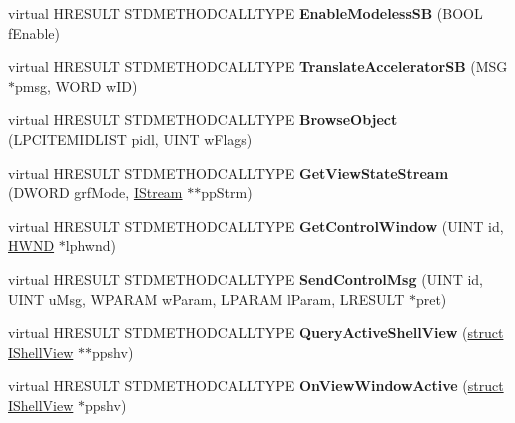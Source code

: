 \begin{DoxyCompactItemize}
virtual H\+R\+E\+S\+U\+LT S\+T\+D\+M\+E\+T\+H\+O\+D\+C\+A\+L\+L\+T\+Y\+PE {\bfseries Enable\+Modeless\+SB} (B\+O\+OL f\+Enable)
\item 
\mbox{\label{class_c_desktop_browser_a4ca359dde92b92bd9cf81b05a684ce3b}} 
virtual H\+R\+E\+S\+U\+LT S\+T\+D\+M\+E\+T\+H\+O\+D\+C\+A\+L\+L\+T\+Y\+PE {\bfseries Translate\+Accelerator\+SB} (M\+SG $\ast$pmsg, W\+O\+RD w\+ID)
\item 
\mbox{\label{class_c_desktop_browser_abce50bde5a24d06416c0c3e84f82889b}} 
virtual H\+R\+E\+S\+U\+LT S\+T\+D\+M\+E\+T\+H\+O\+D\+C\+A\+L\+L\+T\+Y\+PE {\bfseries Browse\+Object} (L\+P\+C\+I\+T\+E\+M\+I\+D\+L\+I\+ST pidl, U\+I\+NT w\+Flags)
\item 
\mbox{\label{class_c_desktop_browser_a8a6dfca4aac3681960f8a303a7d6db5b}} 
virtual H\+R\+E\+S\+U\+LT S\+T\+D\+M\+E\+T\+H\+O\+D\+C\+A\+L\+L\+T\+Y\+PE {\bfseries Get\+View\+State\+Stream} (D\+W\+O\+RD grf\+Mode, \hyperlink{interface_i_stream}{I\+Stream} $\ast$$\ast$pp\+Strm)
\item 
\mbox{\label{class_c_desktop_browser_a09c9e744c4cf9a9417bd7e00e75e8860}} 
virtual H\+R\+E\+S\+U\+LT S\+T\+D\+M\+E\+T\+H\+O\+D\+C\+A\+L\+L\+T\+Y\+PE {\bfseries Get\+Control\+Window} (U\+I\+NT id, \hyperlink{interfacevoid}{H\+W\+ND} $\ast$lphwnd)
\item 
\mbox{\label{class_c_desktop_browser_a8da2ad4280115456f5a5204f645f7714}} 
virtual H\+R\+E\+S\+U\+LT S\+T\+D\+M\+E\+T\+H\+O\+D\+C\+A\+L\+L\+T\+Y\+PE {\bfseries Send\+Control\+Msg} (U\+I\+NT id, U\+I\+NT u\+Msg, W\+P\+A\+R\+AM w\+Param, L\+P\+A\+R\+AM l\+Param, L\+R\+E\+S\+U\+LT $\ast$pret)
\item 
\mbox{\label{class_c_desktop_browser_af8022669766d5f46081e6fa57f20d055}} 
virtual H\+R\+E\+S\+U\+LT S\+T\+D\+M\+E\+T\+H\+O\+D\+C\+A\+L\+L\+T\+Y\+PE {\bfseries Query\+Active\+Shell\+View} (\hyperlink{interfacestruct}{struct} \hyperlink{interface_i_shell_view}{I\+Shell\+View} $\ast$$\ast$ppshv)
\item 
\mbox{\label{class_c_desktop_browser_a5e15f0c607ff9421267fc8e46fad0aea}} 
virtual H\+R\+E\+S\+U\+LT S\+T\+D\+M\+E\+T\+H\+O\+D\+C\+A\+L\+L\+T\+Y\+PE {\bfseries On\+View\+Window\+Active} (\hyperlink{interfacestruct}{struct} \hyperlink{interface_i_shell_view}{I\+Shell\+View} $\ast$ppshv)

\end{DoxyCompactItemize}
